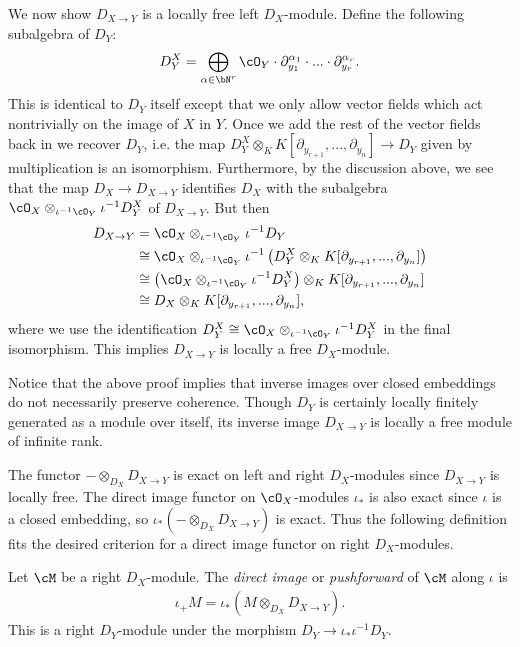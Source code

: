 \begin{prf}
	We now show $D_{X\to Y}$ is a locally free left $D_X$-module. Define the following subalgebra of $D_Y$:
	\begin{align*}
		D_Y^X = \bigoplus_{\alpha\in \bN^r} \cO_Y \cdot \partial_{y_1}^{\alpha_1}\cdot...\cdot\partial_{y_r}^{\alpha_r}.
	\end{align*}
	This is identical to $D_Y$ itself except that we only allow vector fields which act nontrivially on the image of $X$ in $Y$. Once we add the rest of the vector fields back in we recover $D_Y$, i.e. the map $D_Y^X\otimes_{K}K[\partial_{y_{r+1}},...,\partial_{y_n}]\to D_Y$ given by multiplication is an isomorphism. Furthermore, by the discussion above, we see that the map $D_X\to D_{X\to Y}$ identifies $D_X$ with the subalgebra $\cO_X\otimes_{\iota^{-1}\cO_Y} \iota^{-1}D^X_Y$ of $D_{X\to Y}$. But then
	\begin{align*}
		D_{X\to Y} 
		  &= \cO_X\otimes_{\iota^{-1}\cO_Y}\iota^{-1}D_Y \\
		  &\cong \cO_X\otimes_{\iota^{-1}\cO_Y} \iota^{-1}\left(D^X_Y\otimes_K K[\partial_{y_{r+1}},...,\partial_{y_n}]\right) \\
		  &\cong \left(\cO_X\otimes_{\iota^{-1}\cO_Y} \iota^{-1}D^X_Y\right)\otimes_K K[\partial_{y_{r+1}},...,\partial_{y_n}] \\
		  &\cong D_X\otimes_K K[\partial_{y_{r+1}},...,\partial_{y_n}],
	\end{align*}
	where we use the identification $D_Y^X \cong \cO_X\otimes_{\iota^{-1}\cO_Y} \iota^{-1}D^X_Y$ in the final isomorphism. This implies $D_{X\to Y}$ is locally a free $D_X$-module.
\end{prf}
\begin{rmk}\label{rmk:inverse-image-no-preserve-coherence}
	Notice that the above proof implies that inverse images over closed embeddings do not necessarily preserve coherence. Though $D_Y$ is certainly locally finitely generated as a module over itself, its inverse image $D_{X\to Y}$ is locally a free module of infinite rank.
\end{rmk}
The functor $-\otimes_{D_X}D_{X\to Y}$ is exact on left and right $D_X$-modules since $D_{X\to Y}$ is locally free. The direct image functor on $\cO_X$-modules $\iota_*$ is also exact since $\iota$ is a closed embedding, so $\iota_*(-\otimes_{D_X} D_{X\to Y})$ is exact. Thus the following definition fits the desired criterion for a direct image functor on right $D_X$-modules.
\begin{defn}\label{defn:direct-image-right}
	Let $\cM$ be a right $D_X$-module. The \emph{direct image} or \emph{pushforward} of $\cM$ along $\iota$ is
	\begin{align*}
		\iota_+M = \iota_*(M\otimes_{D_X} D_{X\to Y}).
	\end{align*}
	This is a right $D_Y$-module under the morphism $D_Y\to \iota_*\iota^{-1}D_Y$. 
\end{defn}
